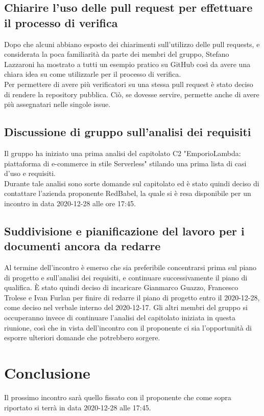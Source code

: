 \subsection{Chiarire l'uso delle pull request per effettuare il processo di verifica}
Dopo che alcuni abbiano esposto dei chiarimenti sull'utilizzo delle pull requests, e considerata la poca familiarità da parte dei membri del gruppo, Stefano Lazzaroni ha mostrato a tutti un esempio pratico su GitHub così da avere una chiara idea su come utilizzarle per il processo di verifica.\\
Per permettere di avere più verificatori su una stessa pull request è stato deciso di rendere la repository pubblica. Ciò, se dovesse servire, permette anche di avere più assegnatari nelle singole issue.

\subsection{Discussione di gruppo sull'analisi dei requisiti}
Il gruppo ha iniziato una prima analisi del capitolato C2 "EmporioLambda: piattaforma di e-commerce in stile Serverless" stilando una prima lista di casi d'uso e requisiti.\\
Durante tale analisi sono sorte domande sul capitolato ed è stato quindi deciso di contattare l'azienda proponente RedBabel, la quale si è resa disponibile per un incontro in data 2020-12-28 alle ore 17:45.

\subsection{Suddivisione e pianificazione del lavoro per i documenti ancora da redarre} 
Al termine dell'incontro è emerso che sia preferibile concentrarsi prima sul piano di progetto e sull'analisi dei requisiti, e continuare successivamente il piano di qualifica.
È stato quindi deciso di incaricare Gianmarco Guazzo, Francesco Trolese e Ivan Furlan per finire di redarre il piano di progetto entro il 2020-12-28, come deciso nel verbale interno del 2020-12-17. Gli altri membri del gruppo si occuperanno invece di continuare l'analisi del capitolato iniziata in questa riunione, così che in vista dell'incontro con il proponente ci sia l'opportunità di esporre ulteriori domande che potrebbero sorgere.

\section{Conclusione}
Il prossimo incontro sarà quello fissato con il proponente che come sopra riportato si terrà in data 2020-12-28 alle 17:45.

